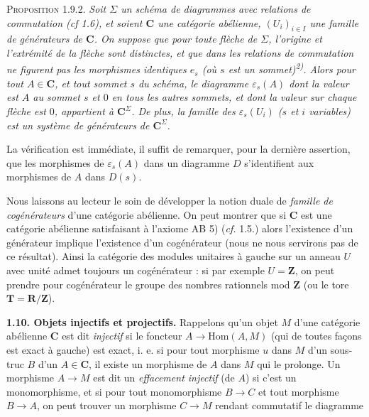 
\textsc{Proposition 1.9.2.} \textit{Soit $\Sigma$ un schéma de
diagrammes avec relations de commutation \textup{(}\textit{cf} \textup{1.6)}, et soient $\mathbf{C}$ une
catégorie abélienne, $(U_i)_{i\in I}$ une famille de générateurs de $\mathbf{C}$. On
suppose que pour toute flèche de $\Sigma$, l'origine et l'extrémité de la
flèche sont distinctes, et que dans les relations de commutation ne figurent
pas les morphismes identiques $e_s$ (où $s$ est un sommet)\textsuperscript{2)}.
Alors pour tout $A\in \mathbf{C}$, et tout sommet $s$ du schéma, le diagramme
$\varepsilon_s(A)$ dont la valeur est $A$ au sommet $s$ et $0$ en tous les
autres sommets, et dont la valeur sur chaque flèche est $0$, appartient à
$\mathbf{C}^\Sigma$. De plus, la famille des $\varepsilon_s(U_i)$ ($s$ et $i$
variables) est un système de générateurs de $\mathbf{C}^\Sigma$.}

La vérification est immédiate, il suffit de remarquer, pour la dernière
assertion, que les morphismes de $\varepsilon_s(A)$ dans un diagramme $D$
s'identifient aux morphismes de $A$ dans $D(s)$.

Nous laissons au lecteur le soin de développer la notion duale de
\textit{famille de cogénérateurs} d'une catégorie abélienne. On peut montrer
que si $\mathbf{C}$ est une catégorie abélienne satisfaisant à l'axiome AB 5)
(\textit{cf.} 1.5.) alors l'existence d'un générateur implique l'existence d'un
cogénérateur (nous ne nous servirons pas de ce résultat). Ainsi la catégorie
des modules unitaires à gauche sur un anneau $U$ avec unité admet toujours un
cogénérateur : si par exemple $U=\mathbf Z$, on peut prendre pour cogénérateur
le groupe des nombres rationnels mod $\mathbf Z$ (ou le tore
$\mathbf T=\mathbf R/\mathbf Z$).

\textbf{1.10. Objets injectifs et projectifs.}
Rappelons qu'un objet $M$ d'une catégorie abélienne $\mathbf{C}$ est dit
\textit{injectif} si le foncteur $A\to\mathrm{Hom}(A,M)$ (qui de toutes
façons est exact à gauche) est exact, i. e. si pour tout morphisme $u$ dans
$M$ d'un sous-truc $B$ d'un $A\in \mathbf{C}$, il existe un morphisme de $A$ dans $M$
qui le prolonge.
Un morphisme $A\to M$ est dit un \textit{effacement injectif} (de
$A$) si c'est un monomorphisme, et si pour tout monomorphisme
$B\to C$ et tout morphisme $B\to A$, on peut trouver
un morphisme $C\to M$ rendant commutatif le diagramme

